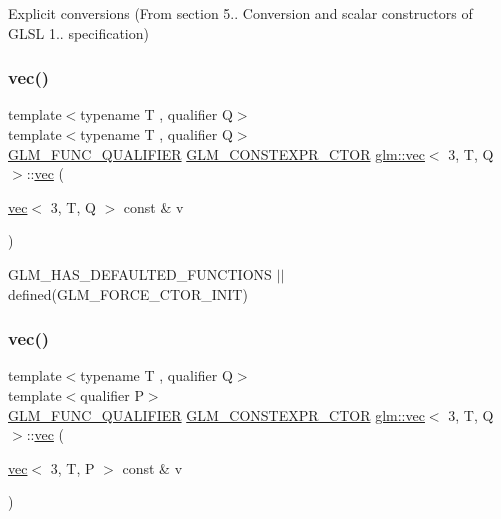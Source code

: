 Explicit conversions (From section 5.. Conversion and scalar constructors of G\+L\+SL 1.. specification) 

\mbox{\label{structglm_1_1vec_3_013_00_01_t_00_01_q_01_4_a9403cc63719b575a9a136e9de99593e4}} 
\subsubsection{\texorpdfstring{vec()}{vec()}\hspace{0.1cm}{\footnotesize\ttfamily [14/23]}}
{\footnotesize\ttfamily template$<$typename T , qualifier Q$>$ \\
template$<$typename T , qualifier Q$>$ \\
\hyperlink{setup_8hpp_a33fdea6f91c5f834105f7415e2a64407}{G\+L\+M\+\_\+\+F\+U\+N\+C\+\_\+\+Q\+U\+A\+L\+I\+F\+I\+ER} \hyperlink{setup_8hpp_ad34178a09666081abdb573c14d1f4a5a}{G\+L\+M\+\_\+\+C\+O\+N\+S\+T\+E\+X\+P\+R\+\_\+\+C\+T\+OR} \hyperlink{structglm_1_1vec}{glm\+::vec}$<$ 3, T, Q $>$\+::\hyperlink{structglm_1_1vec}{vec} (\begin{DoxyParamCaption}\item[{\hyperlink{structglm_1_1vec}{vec}$<$ 3, T, Q $>$ const \&}]{v }\end{DoxyParamCaption})}



G\+L\+M\+\_\+\+H\+A\+S\+\_\+\+D\+E\+F\+A\+U\+L\+T\+E\+D\+\_\+\+F\+U\+N\+C\+T\+I\+O\+NS $\vert$$\vert$ defined(\+G\+L\+M\+\_\+\+F\+O\+R\+C\+E\+\_\+\+C\+T\+O\+R\+\_\+\+I\+N\+I\+T) 

\mbox{\label{structglm_1_1vec_3_013_00_01_t_00_01_q_01_4_a16d0432ba5cb3aaef5e3657b8bf1c889}} 
\subsubsection{\texorpdfstring{vec()}{vec()}\hspace{0.1cm}{\footnotesize\ttfamily [15/23]}}
{\footnotesize\ttfamily template$<$typename T , qualifier Q$>$ \\
template$<$qualifier P$>$ \\
\hyperlink{setup_8hpp_a33fdea6f91c5f834105f7415e2a64407}{G\+L\+M\+\_\+\+F\+U\+N\+C\+\_\+\+Q\+U\+A\+L\+I\+F\+I\+ER} \hyperlink{setup_8hpp_ad34178a09666081abdb573c14d1f4a5a}{G\+L\+M\+\_\+\+C\+O\+N\+S\+T\+E\+X\+P\+R\+\_\+\+C\+T\+OR} \hyperlink{structglm_1_1vec}{glm\+::vec}$<$ 3, T, Q $>$\+::\hyperlink{structglm_1_1vec}{vec} (\begin{DoxyParamCaption}\item[{\hyperlink{structglm_1_1vec}{vec}$<$ 3, T, P $>$ const \&}]{v }\end{DoxyParamCaption})}




